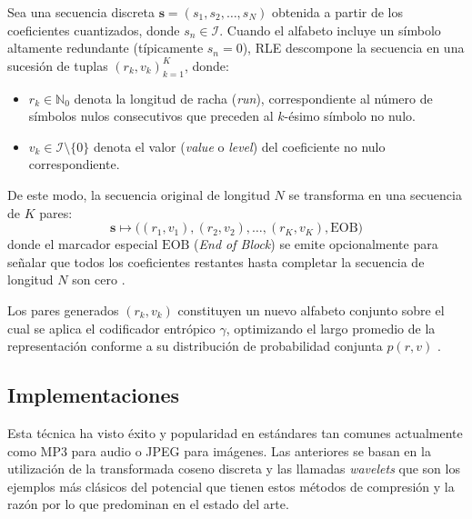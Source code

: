     Sea una secuencia discreta $\mathbf{s} = (s_1, s_2, \dots, s_N)$ obtenida a partir de los coeficientes cuantizados, donde $s_n \in \mathcal{I}$. Cuando el alfabeto incluye un símbolo altamente redundante (típicamente $s_n = 0$), RLE descompone la secuencia en una sucesión de tuplas $(r_k, v_k)_{k=1}^K$, donde:
    \begin{itemize}
        \item $r_k \in \mathbb{N}_0$ denota la longitud de racha (\textit{run}), correspondiente al número de símbolos nulos consecutivos que preceden al $k$-ésimo símbolo no nulo.
        \item $v_k \in \mathcal{I} \setminus \{0\}$ denota el valor (\textit{value} o \textit{level}) del coeficiente no nulo correspondiente.
    \end{itemize}

    De este modo, la secuencia original de longitud $N$ se transforma en una secuencia de $K$ pares:
    \begin{equation}
        \mathbf{s} \mapsto \big( (r_1, v_1), (r_2, v_2), \dots, (r_K, v_K), \text{EOB} \big)
    \end{equation}
    donde el marcador especial $\text{EOB}$ (\textit{End of Block}) se emite opcionalmente para señalar que todos los coeficientes restantes hasta completar la secuencia de longitud $N$ son cero \cite{ortega1998rate}.

    Los pares generados $(r_k, v_k)$ constituyen un nuevo alfabeto conjunto sobre el cual se aplica el codificador entrópico $\gamma$, optimizando el largo promedio de la representación conforme a su distribución de probabilidad conjunta $p(r, v)$ \cite{goyal2001theoretical, malvar2006adaptive}.


    \subsection{Implementaciones}
        Esta técnica ha visto éxito y popularidad en estándares tan comunes actualmente como MP3 para audio o JPEG para imágenes. Las anteriores se basan en la utilización de la transformada coseno discreta y las llamadas \textit{wavelets} que son los ejemplos más clásicos del potencial que tienen estos métodos de compresión y la razón por lo que predominan en el estado del arte.\\

